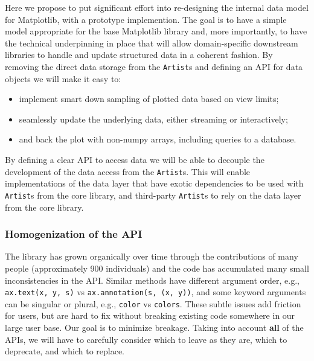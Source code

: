 \documentclass[11pt]{article}  %
\begin{document}
Here we propose to put significant effort into re-designing the
internal data model for Matplotlib, with a prototype implemention. The
goal is to have a simple model appropriate for the base Matplotlib
library and, more importantly, to have the technical underpinning in
place that will allow domain-specific downstream libraries to
handle and update structured data in a coherent fashion.  By
removing the direct data storage from the \texttt{Artist}s and
defining an API for data objects we will make it easy to:
\begin{itemize}
  \item implement smart down sampling of plotted data based on view
    limits;
  \item seamlessly update the underlying data, either
    streaming or interactively;
  \item and back the plot with non-numpy arrays, including queries to a
    database.
\end{itemize}
By defining a clear API to access data we will be able to decouple
the development of the data access from the \texttt{Artist}s.  This
will enable implementations of the data layer that have exotic
dependencies to be used with \texttt{Artist}s from the core library, and
third-party \texttt{Artist}s to rely on the data layer from the core
library.

\subsubsection{Homogenization of the API}

The library has grown organically over time through the contributions
of many people (approximately 900 individuals) and the code has
accumulated many small inconsistencies in the API.  Similar methods
have different argument order, e.g., \texttt{ax.text(x, y, s)} vs
\texttt{ax.annotation(s, (x, y))}, and some keyword arguments can be
singular or plural, e.g., \texttt{color} vs \texttt{colors}.  These
subtle issues add friction for users, but are hard to fix without
breaking existing code somewhere in our large user base.
Our goal is to minimize breakage.  Taking into account
\textbf{all} of the APIs, we will have to carefully consider
which to leave as they are, which to deprecate, and which to
replace.
\end{document}
